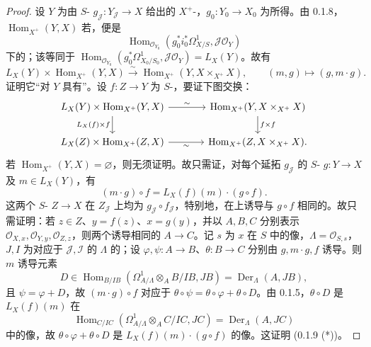 \begin{proof}
设 $Y$ 为由 $S$- $g_{\mathcal J}:Y_{\mathcal J}\to X$ 给出的 $X^+$-，$g_0:Y_0\to X_0$ 为所得。由 0.1.8，$\operatorname{Hom}_{X^+}(Y,X)$ 若，便是
\[\operatorname{Hom}_{\mathcal O_{Y_0}}(g_0^*i_0^*\Omega^1_{X/S},\mathcal J\mathcal O_Y)\]
下的；该等同于 $\operatorname{Hom}_{\mathcal O_{Y_0}}(g_0^*\Omega^1_{X_0/S_0},\mathcal J\mathcal O_Y)=L_X(Y)$。故有
\[L_X(Y)\times\operatorname{Hom}_{X^+}(Y,X)\xrightarrow{\sim}\operatorname{Hom}_{X^+}(Y,X\times_{X^+}X),\qquad(m,g)\mapsto(g,m\cdot g).\]
证明它“对 $Y$ 具有”。设 $f:Z\to Y$ 为 $S$-，要证下图交换：
\[\begin{tikzcd}[column sep=large]
L_X(Y)\times\operatorname{Hom}_{X^+}(Y,X)\arrow[r,"\sim"]\arrow[d,"L_X(f)\times f"']&\operatorname{Hom}_{X^+}(Y,X\times_{X^+}X)\arrow[d,"f\times f"]\\
L_X(Z)\times\operatorname{Hom}_{X^+}(Z,X)\arrow[r,"\sim"']&\operatorname{Hom}_{X^+}(Z,X\times_{X^+}X).
\end{tikzcd}\]
若 $\operatorname{Hom}_{X^+}(Y,X)=\varnothing$，则无须证明。故只需证，对每个延拓 $g_{\mathcal J}$ 的 $S$- $g:Y\to X$ 及 $m\in L_X(Y)$，有
\[(m\cdot g)\circ f=L_X(f)(m)\cdot(g\circ f).\tag{0.1.9 (*)}\]
这两个 $S$- $Z\to X$ 在 $Z_{\mathcal J}$ 上均为 $g_{\mathcal J}\circ f_{\mathcal J}$，特别地，在上诱导与 $g\circ f$ 相同的。故只需证明：若 $z\in Z$、$y=f(z)$、$x=g(y)$，并以 $A,B,C$ 分别表示 $\mathcal O_{X,x},\mathcal O_{Y,y},\mathcal O_{Z,z}$，则两个诱导相同的 $A\to C$。记 $s$ 为 $x$ 在 $S$ 中的像，$\Lambda=\mathcal O_{S,s}$，$J,I$ 为对应于 $\mathcal J,\mathcal I$ 的 $\Lambda$ 的；设 $\varphi,\psi:A\to B$、$\theta:B\to C$ 分别由 $g,m\cdot g,f$ 诱导。则 $m$ 诱导元素
\[D\in\operatorname{Hom}_{B/IB}(\Omega^1_{A/\Lambda}\otimes_A B/IB,JB)=\operatorname{Der}_{\Lambda}(A,JB),\]
且 $\psi=\varphi+D$，故 $(m\cdot g)\circ f$ 对应于 $\theta\circ\psi=\theta\circ\varphi+\theta\circ D$。由 0.1.5，$\theta\circ D$ 是 $L_X(f)(m)$ 在
\[\operatorname{Hom}_{C/IC}(\Omega^1_{A/\Lambda}\otimes_A C/IC,JC)=\operatorname{Der}_{\Lambda}(A,JC)\]
中的像，故 $\theta\circ\varphi+\theta\circ D$ 是 $L_X(f)(m)\cdot(g\circ f)$ 的像。这证明 (0.1.9 (*))。
\end{proof}

